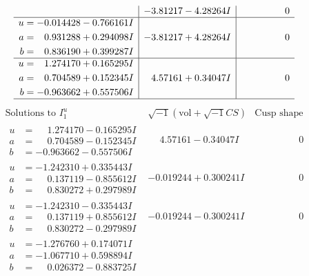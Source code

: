 \documentclass[1p]{elsarticle_modified}
\theoremstyle{definition}
\newcommand{\I}{\sqrt{-1}}
\begin{document}
$$\begin{array}{c|c|c}
 & -3.81217 - 4.28264 I & \phantom{-0.000000 } 0 \\ \hline\begin{aligned}
u &= -0.014428 - 0.766161 I \\
a &= \phantom{-}0.931288 + 0.294098 I \\
b &= \phantom{-}0.836190 + 0.399287 I\end{aligned}
 & -3.81217 + 4.28264 I & \phantom{-0.000000 } 0 \\ \hline\begin{aligned}
u &= \phantom{-}1.274170 + 0.165295 I \\
a &= \phantom{-}0.704589 + 0.152345 I \\
b &= -0.963662 + 0.557506 I\end{aligned}
 & \phantom{-}4.57161 + 0.34047 I & \phantom{-0.000000 } 0\\
 \hline 
 \end{array}$$\newpage$$\begin{array}{c|c|c}  
\text{Solutions to }I^u_{1}& \I (\text{vol} + \sqrt{-1}CS) & \text{Cusp shape}\\
 \hline 
\begin{aligned}
u &= \phantom{-}1.274170 - 0.165295 I \\
a &= \phantom{-}0.704589 - 0.152345 I \\
b &= -0.963662 - 0.557506 I\end{aligned}
 & \phantom{-}4.57161 - 0.34047 I & \phantom{-0.000000 } 0 \\ \hline\begin{aligned}
u &= -1.242310 + 0.335443 I \\
a &= \phantom{-}0.137119 - 0.855612 I \\
b &= \phantom{-}0.830272 + 0.297989 I\end{aligned}
 & -0.019244 + 0.300241 I & \phantom{-0.000000 } 0 \\ \hline\begin{aligned}
u &= -1.242310 - 0.335443 I \\
a &= \phantom{-}0.137119 + 0.855612 I \\
b &= \phantom{-}0.830272 - 0.297989 I\end{aligned}
 & -0.019244 - 0.300241 I & \phantom{-0.000000 } 0 \\ \hline\begin{aligned}
u &= -1.276760 + 0.174071 I \\
a &= -1.067710 + 0.598894 I \\
b &= \phantom{-}0.026372 - 0.883725 I\end{aligned}

\end{array}$$
\end{document}
